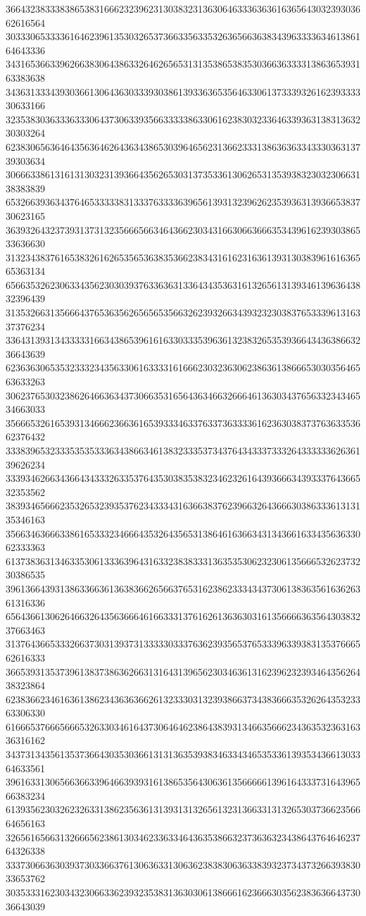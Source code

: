 36643238333838653831666232396231303832313630646333636361636564303239303662616564
30333065333361646239613530326537366335633532636566363834396333363461386164643336
34316536633962663830643863326462656531313538653835303663633331386365393163383638
34363133343930366130643630333930386139336365356463306137333932616239333330633166
32353830363336333064373063393566333338633061623830323364633936313831363230303264
62383065636464356364626436343865303964656231366233313863636334333036313739303634
30666338613161313032313936643562653031373533613062653135393832303230663138383839
65326639363437646533333831333763333639656139313239626235393631393665383730623165
36393264323739313731323566656634643662303431663066366635343961623930386533636630
31323438376165383261626535653638353662383431616231636139313038396161636565363134
65663532623063343562303039376336363133643435363161326561313934613963643832396439
31353266313566643765363562656565356632623932663439323230383765333961316337376234
33643139313433333166343865396161633033353963613238326535393664343638663236643639
62363630653532333234356330616333316166623032363062386361386665303035646563633263
30623765303238626466363437306635316564363466326664613630343765633234346534663033
35666532616539313466623663616539333463376337363333616236303837376363353662376432
33383965323335353533363438663461383233353734376434333733326433333362636139626234
33393462663436643433326335376435303835383234623261643936663439333764366532353562
38393465666235326532393537623433343163663837623966326436663038633361313135346163
35663463666338616533323466643532643565313864616366343134366163343563633062333363
61373836313463353061333639643163323838333136353530623230613566653262373230386535
39613664393138633663613638366265663765316238623334343730613836356163626361316336
65643661306264663264356366646166333137616261363630316135666636356430383237663463
31376436653332663730313937313333303337636239356537653339633938313537666562616333
36653931353739613837386362663131643139656230346361316239623239346435626438323864
62383662346163613862343636366261323330313239386637343836663532626435323363306330
61666537666566653263303461643730646462386438393134663566623436353236316336316162
34373134356135373664303530366131313635393834633434653533613935343661303364633561
39616331306566366339646639393161386535643063613566666139616433373164396566383234
61393562303262326331386235636131393131326561323136633131326530373662356664656163
32656165663132666562386130346233633464363538663237363632343864376464623764326338
33373066363039373033663761306363313063623838306363383932373437326639383033653762
30353331623034323066336239323538313630306138666162366630356238363664373036643039
